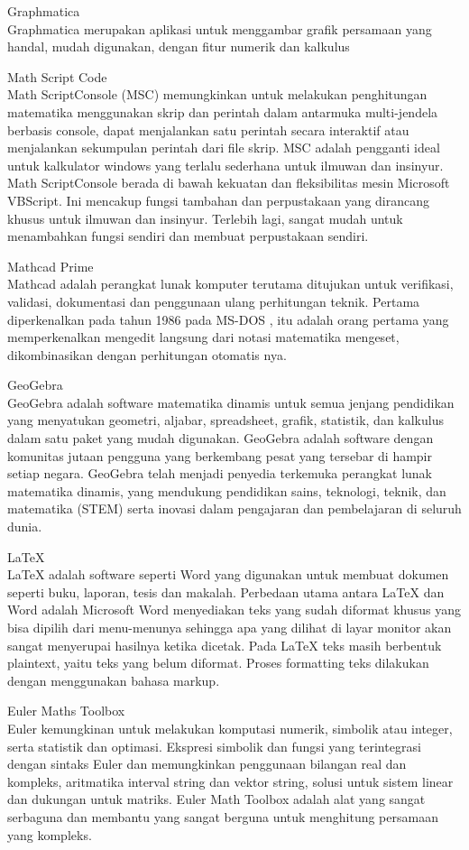 \documentclass[a4paper,10pt]{article}
\begin{document}
\begin{eulernotebook}
\begin{eulercomment}
Graphmatica\\
Graphmatica merupakan aplikasi untuk menggambar grafik persamaan yang
handal, mudah digunakan, dengan fitur numerik dan kalkulus

Math Script Code\\
Math ScriptConsole (MSC) memungkinkan untuk melakukan penghitungan
matematika menggunakan skrip dan perintah dalam antarmuka
multi-jendela berbasis console, dapat menjalankan satu perintah secara
interaktif atau menjalankan sekumpulan perintah dari file skrip. MSC
adalah pengganti ideal untuk kalkulator windows yang terlalu sederhana
untuk ilmuwan dan insinyur. Math ScriptConsole berada di bawah
kekuatan dan fleksibilitas mesin Microsoft VBScript. Ini mencakup
fungsi tambahan dan perpustakaan yang dirancang khusus untuk ilmuwan
dan insinyur. Terlebih lagi, sangat mudah untuk menambahkan fungsi
sendiri dan membuat perpustakaan sendiri.

Mathcad Prime\\
Mathcad adalah perangkat lunak komputer terutama ditujukan untuk
verifikasi, validasi, dokumentasi dan penggunaan ulang perhitungan
teknik. Pertama diperkenalkan pada tahun 1986 pada MS-DOS , itu adalah
orang pertama yang memperkenalkan mengedit langsung dari notasi
matematika mengeset, dikombinasikan dengan perhitungan otomatis nya.

GeoGebra\\
GeoGebra adalah software matematika dinamis untuk semua jenjang
pendidikan yang menyatukan geometri, aljabar, spreadsheet, grafik,
statistik, dan kalkulus dalam satu paket yang mudah digunakan.
GeoGebra adalah software dengan komunitas jutaan pengguna yang
berkembang pesat yang tersebar di hampir setiap negara. GeoGebra telah
menjadi penyedia terkemuka perangkat lunak matematika dinamis, yang
mendukung pendidikan sains, teknologi, teknik, dan matematika (STEM)
serta inovasi dalam pengajaran dan pembelajaran di seluruh dunia.

LaTeX\\
LaTeX adalah software seperti Word yang digunakan untuk membuat
dokumen seperti buku, laporan, tesis dan makalah. Perbedaan utama
antara LaTeX dan Word adalah Microsoft Word menyediakan teks yang
sudah diformat khusus yang bisa dipilih dari menu-menunya sehingga apa
yang dilihat di layar monitor akan sangat menyerupai hasilnya ketika
dicetak. Pada LaTeX teks masih berbentuk plaintext, yaitu teks yang
belum diformat. Proses formatting teks dilakukan dengan menggunakan
bahasa markup.

Euler Maths Toolbox\\
Euler kemungkinan untuk melakukan komputasi numerik, simbolik atau
integer, serta statistik dan optimasi. Ekspresi simbolik dan fungsi
yang terintegrasi dengan sintaks Euler dan memungkinkan penggunaan
bilangan real dan kompleks, aritmatika interval string dan vektor
string, solusi untuk sistem linear dan dukungan untuk matriks. Euler
Math Toolbox adalah alat yang sangat serbaguna dan membantu yang
sangat berguna untuk menghitung persamaan yang kompleks.


\end{eulercomment}
\end{eulernotebook}
\end{document}
